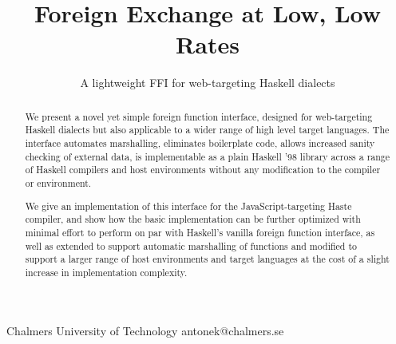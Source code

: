 \documentclass[preprint]{sigplanconf}
\begin{document}
\setlength{\pdfpageheight}{\paperheight}
\setlength{\pdfpagewidth}{\paperwidth}

\exclusivelicense
{} 





\title{Foreign Exchange at Low, Low Rates}
\subtitle{A lightweight FFI for web-targeting Haskell dialects}

           {Chalmers University of Technology}
           {antonek@chalmers.se}

\maketitle

\begin{abstract}
  We present a novel yet simple foreign function interface, designed for
  web-targeting Haskell dialects but also applicable to a wider range of
  high level target languages.
  The interface automates marshalling, eliminates boilerplate
  code, allows increased sanity checking of external data,
  is implementable as a plain Haskell '98 library across a range of
  Haskell compilers and host environments without any modification to the
  compiler or environment.
  
  We give an implementation of this interface for the JavaScript-targeting
  Haste compiler, and show how the basic implementation can be
  further optimized with minimal effort to perform on par with Haskell's
  vanilla foreign function interface, as well as extended to support automatic
  marshalling of functions and modified to support a larger range of host
  environments and target languages at the cost of a slight increase in
  implementation complexity.
\end{abstract}

\end{document}
